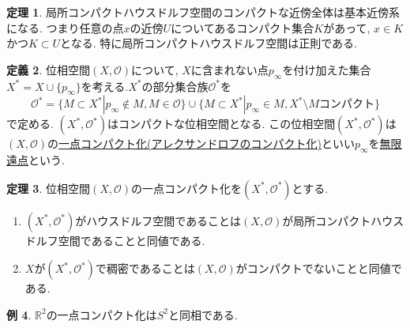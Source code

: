 \documentclass[dvipdfmx,a4paper,11pt]{article}
\newcommand{\R}{\mathbb{R}}
\theoremstyle{definition}
\newtheorem{thm}{定理}
\newtheorem{dfn}[thm]{定義}
\newtheorem{exa}[thm]{例}
\begin{document}
  \begin{tcolorbox}[
    colback = white,
    colframe = green!35!black,
    fonttitle = \bfseries,
    breakable = true]
    \begin{thm}
    局所コンパクトハウスドルフ空間のコンパクトな近傍全体は基本近傍系になる. 
    つまり任意の点$x$の近傍$U$についてあるコンパクト集合$K$があって, $x \in K$かつ$K \subset U$となる.
    特に局所コンパクトハウスドルフ空間は正則である.
  \end{thm}
   \end{tcolorbox}
   
  \begin{tcolorbox}[
    colback = white,
    colframe = green!35!black,
    fonttitle = \bfseries,
    breakable = true]
    \begin{dfn}
 位相空間$(X, \mathscr{O})$について, $X$に含まれない点$p_{\infty}$を付け加えた集合$X^{*} = X \cup \{ p_{\infty}\}$を考える.$X^{*}$の部分集合族$\mathscr{O}^{*}$を
 $$\mathscr{O}^{*} = \{ M \subset X^{*} | p_{\infty} \not \in M, M \in \mathscr{O}\} \cup \{ M \subset X^{*} | p_{\infty}  \in M, X^{*} \setminus M\text{コンパクト}\}
 $$
 で定める. $(X^{*}, \mathscr{O}^{*})$はコンパクトな位相空間となる.
 この位相空間$(X^{*}, \mathscr{O}^{*})$は$(X, \mathscr{O})$の\underline{一点コンパクト化(アレクサンドロフのコンパクト化)}といい$p_{\infty}$を\underline{無限遠点}という.
  \end{dfn}
    \end{tcolorbox}
    
  \begin{tcolorbox}[
    colback = white,
    colframe = green!35!black,
    fonttitle = \bfseries,
    breakable = true]
    \begin{thm}
 位相空間$(X, \mathscr{O})$の一点コンパクト化を$(X^{*}, \mathscr{O}^{*})$とする.
 \begin{enumerate}
  \setlength{\parskip}{0cm} 
  \setlength{\itemsep}{0cm} 
 \item $(X^{*}, \mathscr{O}^{*})$がハウスドルフ空間であることは$(X, \mathscr{O})$が局所コンパクトハウスドルフ空間であることと同値である.
 \item $X$が$(X^{*}, \mathscr{O}^{*})$で稠密であることは$(X, \mathscr{O})$がコンパクトでないことと同値である.
 \end{enumerate}
  \end{thm}
   \end{tcolorbox}
 \begin{exa}
$\R^2$の一点コンパクト化は$S^2$と同相である.
 \end{exa}
\end{document}
